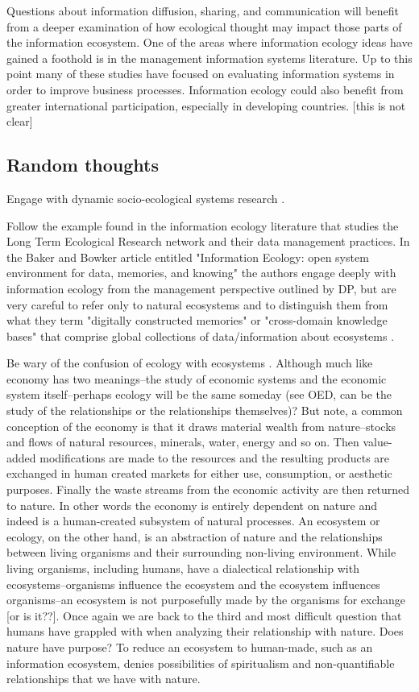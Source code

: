 Questions about information diffusion, sharing, and communication will benefit from a deeper examination of how ecological thought may impact those parts of the information ecosystem. One of the areas where information ecology ideas have gained a foothold is in the management information systems literature. Up to this point many of these studies have focused on evaluating information systems in order to improve business processes. Information ecology could also benefit from greater international participation, especially in developing countries. \citep{wang_information_2015} [this is not clear]

\subsection{Random thoughts}

Engage with dynamic socio-ecological systems research \citep{liu_etal_2007}.

Follow the example found in the information ecology literature that studies the Long Term Ecological Research network and their data management practices. In the Baker and Bowker article entitled "Information Ecology: open system environment for data, memories, and knowing" the authors engage deeply with information ecology from the management perspective outlined by DP, but are very careful to refer only to natural ecosystems and to distinguish them from what they term "digitally constructed memories" or "cross-domain knowledge bases" that comprise global collections of data/information about ecosystems \citep[][p. 131]{baker_2007}.

Be wary of the confusion of ecology with ecosystems \citep[cf. ][]{lucas_2012,nardi_information_1999}. Although much like economy has two meanings--the study of economic systems and the economic system itself--perhaps ecology will be the same someday (see OED, can be the study of the relationships or the relationships themselves)? But note, a common conception of the economy is that it draws material wealth from nature--stocks and flows of natural resources, minerals, water, energy and so on. Then value-added modifications are made to the resources and the resulting products are exchanged in human created markets for either use, consumption, or aesthetic purposes. Finally the waste streams from the economic activity are then returned to nature. In other words the economy is entirely dependent on nature and indeed is a human-created subsystem of natural processes. An ecosystem or ecology, on the other hand, is an abstraction of nature and the relationships between living organisms and their surrounding non-living environment. While living organisms, including humans, have a dialectical relationship with ecosystems--organisms influence the ecosystem and the ecosystem influences organisms--an ecosystem is not purposefully made by the organisms for exchange [or is it??]. Once again we are back to the third and most difficult question that humans have grappled with when analyzing their relationship with nature. Does nature have purpose? To reduce an ecosystem to human-made, such as an information ecosystem, denies possibilities of spiritualism and non-quantifiable relationships that we have with nature.
